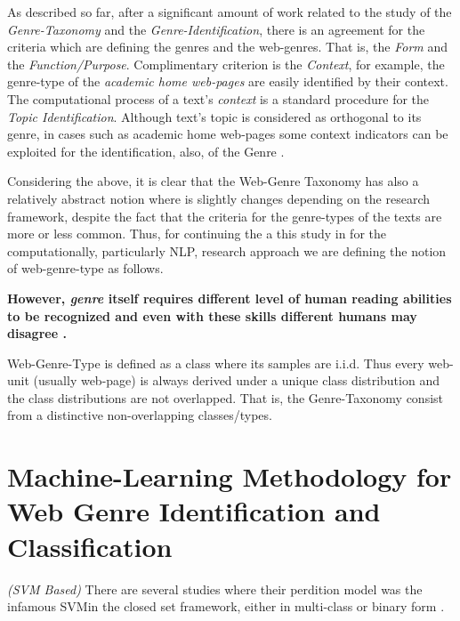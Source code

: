 As described so far, after a significant amount of work related to the study of the \textit{Genre-Taxonomy} and the \textit{Genre-Identification}, there is an agreement for the criteria which are defining the genres and the  web-genres. That is, the \textit{Form} and the \textit{Function/Purpose}. Complimentary criterion is the \textit{Context}, for example, the genre-type of the \textit{academic home web-pages} are easily identified by their context. The computational process of a text's \textit{context} is a standard procedure for the \textit{Topic Identification}. Although text's topic is considered as orthogonal to its genre, in cases such as academic home web-pages some context indicators can be exploited for the identification, also, of the Genre \parencite{coutinho2009describe,crowston2011problems,kanaris2009learning,jebari2015combination,gollapalli2011identifying}. 

Considering the above, it is clear that the Web-Genre Taxonomy has also a relatively abstract notion where is slightly changes depending on the research framework, despite the fact that the criteria for the genre-types of the texts are more or less common. Thus, for continuing the a this study in for the computationally, particularly NLP, research approach we are defining the notion of web-genre-type as follows.   

\textbf{However, \textit{genre} itself requires different level of human reading abilities to be recognized and even with these skills different humans may disagree \parencite{mccarthy2009psychological}.}

\begin{definition} Web-Genre-Type is defined as a class where its samples are i.i.d. Thus every web-unit (usually web-page) is always derived under a unique class distribution and the class distributions are not overlapped. That is, the Genre-Taxonomy consist from a distinctive non-overlapping classes/types.
\end{definition}

\section{Machine-Learning Methodology for Web Genre Identification and Classification}\label{chap:relevant_work:sec:machine_learning_methods}

\textit{(SVM Based)} There are several studies where their perdition model was the infamous SVMin the closed set framework, either in multi-class or binary form \parencite{dai2018fine}. 

